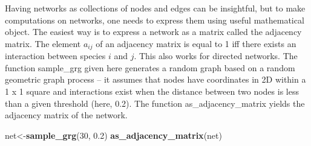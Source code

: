 \documentclass[
]{book}
\newenvironment{Shaded}{\begin{snugshade}}{\end{snugshade}}
\newcommand{\DecValTok}[1]{\textcolor[rgb]{0.00,0.00,0.81}{#1}}
\newcommand{\FloatTok}[1]{\textcolor[rgb]{0.00,0.00,0.81}{#1}}
\newcommand{\FunctionTok}[1]{\textcolor[rgb]{0.13,0.29,0.53}{\textbf{#1}}}
\newcommand{\NormalTok}[1]{#1}
\newcommand{\OtherTok}[1]{\textcolor[rgb]{0.56,0.35,0.01}{#1}}
\theoremstyle{definition}
\theoremstyle{definition}
\theoremstyle{definition}
\theoremstyle{definition}
\theoremstyle{remark}
\begin{document}
Having networks as collections of nodes and edges can be insightful, but to make computations on networks, one needs to express them using useful mathematical object. The easiest way is to express a network as a matrix called the adjacency matrix. The element \(a_{ij}\) of an adjacency matrix is equal to 1 iff there exists an interaction between species \(i\) and \(j\). This also works for directed networks.
The function sample\_grg given here generates a random graph based on a random geometric graph process -- it assumes that nodes have coordinates in 2D within a 1 x 1 square and interactions exist when the distance between two nodes is less than a given threshold (here, 0.2).
The function as\_adjacency\_matrix yields the adjacency matrix of the network.

\begin{Shaded}
\begin{Highlighting}[]
\NormalTok{net}\OtherTok{\textless{}{-}}\FunctionTok{sample\_grg}\NormalTok{(}\DecValTok{30}\NormalTok{, }\FloatTok{0.2}\NormalTok{)}
\FunctionTok{as\_adjacency\_matrix}\NormalTok{(net)}
\end{Highlighting}
\end{Shaded}
\end{document}

